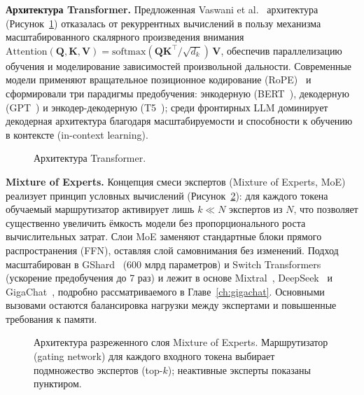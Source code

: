 \textbf{Архитектура Transformer.} Предложенная Vaswani et al.~\cite{vaswani2017attention} архитектура (Рисунок~\ref{fig:transformer}) отказалась от рекуррентных вычислений в пользу механизма масштабированного скалярного произведения внимания $\mathrm{Attention}(\mathbf{Q}, \mathbf{K}, \mathbf{V}) = \mathrm{softmax}(\mathbf{Q}\mathbf{K}^\top / \sqrt{d_k})\,\mathbf{V}$, обеспечив параллелизацию обучения и моделирование зависимостей произвольной дальности. Современные модели применяют вращательное позиционное кодирование (RoPE)~\cite{su2024rope} и сформировали три парадигмы предобучения: энкодерную (BERT~\cite{devlin2019bert}), декодерную (GPT~\cite{radford2018gpt,radford2019gpt2,brown2020gpt3}) и энкодер-декодерную (T5~\cite{raffel2020t5}); среди фронтирных LLM доминирует декодерная архитектура благодаря масштабируемости и способности к обучению в контексте (in-context learning).

\begin{figure}[htbp]
    \centering
    \resizebox{0.55\textwidth}{!}{
        
    }
    \caption{Архитектура Transformer.}
    \label{fig:transformer}
\end{figure}

\textbf{Mixture of Experts.} Концепция смеси экспертов (Mixture of Experts, MoE)~\cite{jacobs1991moe,shazeer2017moe} реализует принцип условных вычислений (Рисунок~\ref{fig:moe_architecture}): для каждого токена обучаемый маршрутизатор активирует лишь $k \ll N$ экспертов из $N$, что позволяет существенно увеличить ёмкость модели без пропорционального роста вычислительных затрат. Слои MoE заменяют стандартные блоки прямого распространения (FFN), оставляя слой самовнимания без изменений. Подход масштабирован в GShard~\cite{lepikhin2021gshard} (600 млрд параметров) и Switch Transformers~\cite{fedus2022switch} (ускорение предобучения до 7 раз) и лежит в основе Mixtral~\cite{jiang2024mixtral}, DeepSeek~\cite{deepseek2024v2,dai2024deepseekmoe} и GigaChat~\cite{2506.09440}, подробно рассматриваемого в Главе~\ref{ch:gigachat}. Основными вызовами остаются балансировка нагрузки между экспертами и повышенные требования к памяти.

\begin{figure}[htbp]
    \centering
    \resizebox{0.8\textwidth}{!}{
        
    }
    \caption{Архитектура разреженного слоя Mixture of Experts. Маршрутизатор (gating network) для каждого входного токена выбирает подмножество экспертов (top-$k$); неактивные эксперты показаны пунктиром.}
    \label{fig:moe_architecture}
\end{figure}

